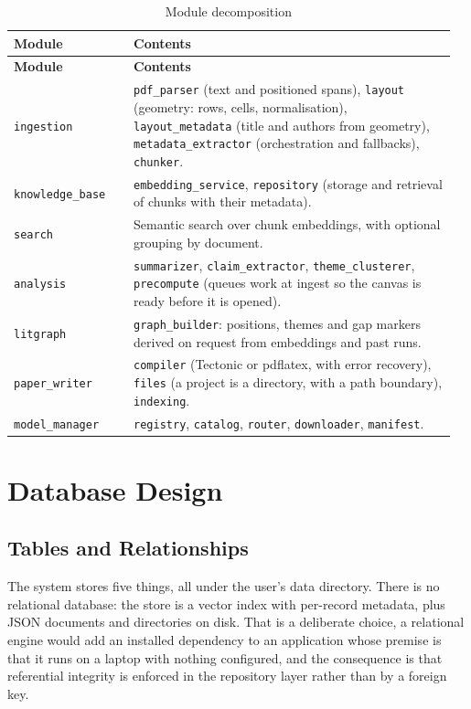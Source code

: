 \documentclass[12pt,a4paper]{report}
\begin{document}
\begin{longtable}{@{}p{0.26\linewidth}p{0.70\linewidth}@{}}
\caption{Module decomposition}\label{tab:modules}\\
\toprule
\textbf{Module} & \textbf{Contents} \\
\midrule
\endfirsthead
\toprule
\textbf{Module} & \textbf{Contents} \\
\midrule
\endhead

\texttt{ingestion} & \texttt{pdf\_parser} (text and positioned spans),
  \texttt{layout} (geometry: rows, cells, normalisation), \texttt{layout\_metadata}
  (title and authors from geometry), \texttt{metadata\_extractor}
  (orchestration and fallbacks), \texttt{chunker}. \\
\addlinespace
\texttt{knowledge\_base} & \texttt{embedding\_service}, \texttt{repository}
  (storage and retrieval of chunks with their metadata). \\
\addlinespace
\texttt{search} & Semantic search over chunk embeddings, with optional
  grouping by document. \\
\addlinespace
\texttt{analysis} & \texttt{summarizer}, \texttt{claim\_extractor},
  \texttt{theme\_clusterer}, \texttt{precompute} (queues work at ingest so the
  canvas is ready before it is opened). \\
\addlinespace
\texttt{litgraph} & \texttt{graph\_builder}: positions, themes and gap markers
  derived on request from embeddings and past runs. \\
\addlinespace
\texttt{paper\_writer} & \texttt{compiler} (Tectonic or pdflatex, with error
  recovery), \texttt{files} (a project is a directory, with a path boundary),
  \texttt{indexing}. \\
\addlinespace
\texttt{model\_manager} & \texttt{registry}, \texttt{catalog},
  \texttt{router}, \texttt{downloader}, \texttt{manifest}. \\
\bottomrule
\end{longtable}

\section{Database Design}

\subsection{Tables and Relationships}

The system stores five things, all under the user's data directory. There is no
relational database: the store is a vector index with per-record metadata, plus
JSON documents and directories on disk. That is a deliberate choice, a
relational engine would add an installed dependency to an application whose
premise is that it runs on a laptop with nothing configured, and the
consequence is that referential integrity is enforced in the repository layer
rather than by a foreign key.
\end{document}
